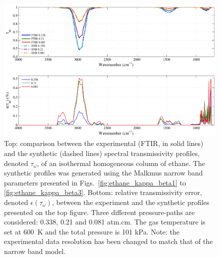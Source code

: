 \begin{figure}[p]
\includegraphics[width=\textwidth]{Figures/Comparison_Fit_Ethane_MALKMUS_Temp600K.pdf}
\caption{Top: comparison between the experimental (FTIR, in solid lines) and the synthetic (dashed lines) spectral transmissivity profiles, denoted $\tau_{\omega}$, of an isothermal homogeneous column of ethane. The synthetic profiles was generated using the Malkmus narrow band parameters presented in Figs.~\ref{fig:ethane_kappa_beta1} to \ref{fig:ethane_kappa_beta3}. Bottom: relative transmissivity error, denoted $\epsilon{(\tau_{\omega})}$, between the experiment and the synthetic profiles presented on the top figure. Three different pressure-paths are considered: 0.338, 0.21 and 0.081 atm.cm. The gas temperature is set at 600~K and the total pressure is 101 kPa. Note: the experimental data resolution has been changed to match that of the narrow band model. \label{fig:ethane_SNBVerify_600K}}
\end{figure}


